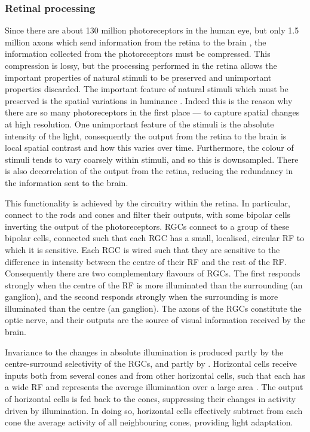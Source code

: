 \subsubsection{Retinal processing}

Since there are about \num{130} million photoreceptors in the human eye, but only \num{1.5} million axons which send information from the retina to the brain \citep{Nassi2009}, the information collected from the photoreceptors must be compressed.
This compression is lossy, but the processing performed in the retina allows the important properties of natural stimuli to be preserved and unimportant properties discarded.
The important feature of natural stimuli which must be preserved is the spatial variations in luminance \citep[Chapter~11]{nsbook}.
Indeed this is the reason why there are so many photoreceptors in the first place --- to capture spatial changes at high resolution.
One unimportant feature of the stimuli is the absolute intensity of the light, consequently the output from the retina to the brain is local spatial contrast and how this varies over time.
Furthermore, the colour of stimuli tends to vary coarsely within stimuli, and so this is downsampled.
There is also decorrelation of the output from the retina, reducing the redundancy in the information sent to the brain.

This functionality is achieved by the circuitry within the retina.
In particular,  connect to the rods and cones and filter their outputs, with some bipolar cells inverting the output of the photoreceptors.
\acp{RGC} connect to a group of these bipolar cells, connected such that each \ac{RGC} has a small, localised, circular \ac{RF} to which it is sensitive.
Each \ac{RGC} is wired such that they are sensitive to the difference in intensity between the centre of their \ac{RF} and the rest of the \ac{RF}.
Consequently there are two complementary flavours of \acp{RGC}.
The first responds strongly when the centre of the \ac{RF} is more illuminated than the surrounding (an  ganglion), and the second responds strongly when the surrounding is more illuminated than the centre (an  ganglion).
The axons of the \acp{RGC} constitute the optic nerve, and their outputs are the source of visual information received by the brain.

Invariance to the changes in absolute illumination is produced partly by the centre-surround selectivity of the \acp{RGC}, and partly by .
Horizontal cells receive inputs both from several cones and from other horizontal cells, such that each has a wide \ac{RF} and represents the average illumination over a large area \citep[Chapter~11]{nsbook}.
The output of horizontal cells is fed back to the cones, suppressing their changes in activity driven by illumination.
In doing so, horizontal cells effectively subtract from each cone the average activity of all neighbouring cones, providing light adaptation.


